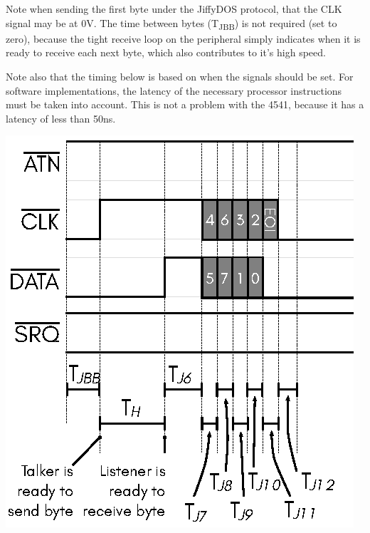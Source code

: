 Note when sending the first byte under the JiffyDOS{\texttrademark}
protocol, that the CLK signal may be at 0V.  The time between bytes
(T\textsubscript{JBB}) is not required (set to zero), because the
tight receive loop on the peripheral simply indicates when it is ready
to receive each next byte, which also contributes to it's high speed.

Note also that the timing below is based on when the signals should be
set. For software implementations, the latency of the necessary
processor instructions must be taken into account. This is not a
problem with the 4541, because it has a latency of less than 50ns.

\begin{center}
\includegraphics{images/IEC-Timing-Diagrams/IEC-Timing-Diagram-Send-Byte-JD}
\end{center}

